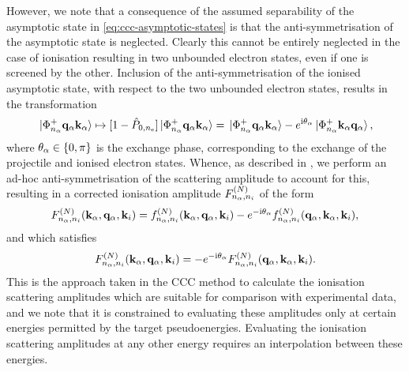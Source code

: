 \documentclass[draft]{article}
\begin{document}
However, we note that a consequence of the assumed separability of the
asymptotic state in \autoref{eq:ccc-asymptotic-states} is that the
anti-symmetrisation of the asymptotic state is neglected.
Clearly this cannot be entirely neglected in the case of ionisation resulting in
two unbounded electron states, even if one is screened by the other.
Inclusion of the anti-symmetrisation of the ionised asymptotic state, with
respect to the two unbounded electron states, results in the transformation
\begin{equation}
  \label{eq:asymptotic-ionised-anti-symmetrised}
  \ket*{\Phi_{n_{\alpha}}^{+} \vb{q}_{\alpha} \vb{k}_{\alpha}}
  \mapsto
  [1 - \hat{P}_{0, n_{\mathrm{e}}}]
  \ket*{\Phi_{n_{\alpha}}^{+} \vb{q}_{\alpha} \vb{k}_{\alpha}}
  =
  \ket*{\Phi_{n_{\alpha}}^{+} \vb{q}_{\alpha} \vb{k}_{\alpha}}
  -
  e^{\mathrm{i} \theta_{\alpha}}
  \ket*{\Phi_{n_{\alpha}}^{+} \vb{k}_{\alpha} \vb{q}_{\alpha}}
  ,
\end{equation}
where $\theta_{\alpha} \in \lbrace0, \pi\rbrace$ is the exchange phase, corresponding
to the exchange of the projectile and ionised electron states.
Whence, as described in \cite{PhysRevLett.78.4721, PhysRevLett.83.1570,
  PhysRevLett.89.273201}, we perform an ad-hoc anti-symmetrisation of the
scattering amplitude to account for this, resulting in a corrected ionisation
amplitude $F_{n_{\alpha}, n_{i}}^{(N)}$ of the form
\begin{equation}
  \label{eq:scattering-amplitude-ionisation-anti-symmetrised}
  F_{n_{\alpha}, n_{i}}^{(N)}(
    \vb{k}_{\alpha}, \vb{q}_{\alpha}, \vb{k}_{i}
  )
  =
  f_{n_{\alpha}, n_{i}}^{(N)}(
    \vb{k}_{\alpha}, \vb{q}_{\alpha}, \vb{k}_{i}
  )
  -
  e^{- \mathrm{i} \theta_{\alpha}}
  f_{n_{\alpha}, n_{i}}^{(N)}(
    \vb{q}_{\alpha}, \vb{k}_{\alpha}, \vb{k}_{i}
  )
  ,
\end{equation}
and which satisfies
\begin{equation}
  \label{eq:scattering-amplitude-ionisation-anti-symmetrised-constraint}
  F_{n_{\alpha}, n_{i}}^{(N)}(
    \vb{k}_{\alpha}, \vb{q}_{\alpha}, \vb{k}_{i}
  )
  =
  -
  e^{- \mathrm{i} \theta_{\alpha}}
  F_{n_{\alpha}, n_{i}}^{(N)}(
    \vb{q}_{\alpha}, \vb{k}_{\alpha}, \vb{k}_{i}
  )
  .
\end{equation}
This is the approach taken in the CCC method to calculate the ionisation
scattering amplitudes which are suitable for comparison with experimental data,
and we note that it is constrained to evaluating these amplitudes only at
certain energies permitted by the target pseudoenergies.
Evaluating the ionisation scattering amplitudes at any other energy requires
an interpolation between these energies.
\end{document}
